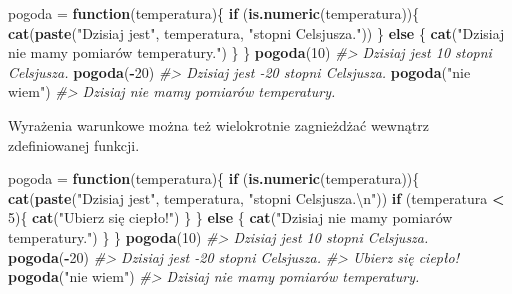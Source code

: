 \documentclass[paper=6in:9in,pagesize=pdftex,headinclude=on,footinclude=on,10pt]{scrbook}
\newenvironment{Shaded}{\begin{snugshade}}{\end{snugshade}}
\newcommand{\CharTok}[1]{\textcolor[rgb]{0.31,0.60,0.02}{#1}}
\newcommand{\CommentTok}[1]{\textcolor[rgb]{0.56,0.35,0.01}{\textit{#1}}}
\newcommand{\ControlFlowTok}[1]{\textcolor[rgb]{0.13,0.29,0.53}{\textbf{#1}}}
\newcommand{\DecValTok}[1]{\textcolor[rgb]{0.00,0.00,0.81}{#1}}
\newcommand{\KeywordTok}[1]{\textcolor[rgb]{0.13,0.29,0.53}{\textbf{#1}}}
\newcommand{\NormalTok}[1]{#1}
\newcommand{\OperatorTok}[1]{\textcolor[rgb]{0.81,0.36,0.00}{\textbf{#1}}}
\newcommand{\StringTok}[1]{\textcolor[rgb]{0.31,0.60,0.02}{#1}}
\begin{document}
\begin{Shaded}
\begin{Highlighting}[]
\NormalTok{pogoda =}\StringTok{ }\ControlFlowTok{function}\NormalTok{(temperatura)\{}
  \ControlFlowTok{if}\NormalTok{ (}\KeywordTok{is.numeric}\NormalTok{(temperatura))\{}
    \KeywordTok{cat}\NormalTok{(}\KeywordTok{paste}\NormalTok{(}\StringTok{"Dzisiaj jest"}\NormalTok{, temperatura, }\StringTok{"stopni Celsjusza."}\NormalTok{))}
\NormalTok{  \} }\ControlFlowTok{else}\NormalTok{ \{}
    \KeywordTok{cat}\NormalTok{(}\StringTok{"Dzisiaj nie mamy pomiarów temperatury."}\NormalTok{)}
\NormalTok{  \}}
\NormalTok{\}}
\KeywordTok{pogoda}\NormalTok{(}\DecValTok{10}\NormalTok{)}
\CommentTok{#> Dzisiaj jest 10 stopni Celsjusza.}
\KeywordTok{pogoda}\NormalTok{(}\OperatorTok{-}\DecValTok{20}\NormalTok{)}
\CommentTok{#> Dzisiaj jest -20 stopni Celsjusza.}
\KeywordTok{pogoda}\NormalTok{(}\StringTok{"nie wiem"}\NormalTok{)}
\CommentTok{#> Dzisiaj nie mamy pomiarów temperatury.}
\end{Highlighting}
\end{Shaded}

Wyrażenia warunkowe można też wielokrotnie zagnieżdżać wewnątrz zdefiniowanej funkcji.

\begin{Shaded}
\begin{Highlighting}[]
\NormalTok{pogoda =}\StringTok{ }\ControlFlowTok{function}\NormalTok{(temperatura)\{}
  \ControlFlowTok{if}\NormalTok{ (}\KeywordTok{is.numeric}\NormalTok{(temperatura))\{}
    \KeywordTok{cat}\NormalTok{(}\KeywordTok{paste}\NormalTok{(}\StringTok{"Dzisiaj jest"}\NormalTok{, temperatura, }\StringTok{"stopni Celsjusza.}\CharTok{\textbackslash{}n}\StringTok{"}\NormalTok{))}
    \ControlFlowTok{if}\NormalTok{ (temperatura }\OperatorTok{<}\StringTok{ }\DecValTok{5}\NormalTok{)\{}
      \KeywordTok{cat}\NormalTok{(}\StringTok{"Ubierz się ciepło!"}\NormalTok{)}
\NormalTok{    \}}
\NormalTok{  \} }\ControlFlowTok{else}\NormalTok{ \{}
    \KeywordTok{cat}\NormalTok{(}\StringTok{"Dzisiaj nie mamy pomiarów temperatury."}\NormalTok{)}
\NormalTok{  \}}
\NormalTok{\}}
\KeywordTok{pogoda}\NormalTok{(}\DecValTok{10}\NormalTok{)}
\CommentTok{#> Dzisiaj jest 10 stopni Celsjusza.}
\KeywordTok{pogoda}\NormalTok{(}\OperatorTok{-}\DecValTok{20}\NormalTok{)}
\CommentTok{#> Dzisiaj jest -20 stopni Celsjusza.}
\CommentTok{#> Ubierz się ciepło!}
\KeywordTok{pogoda}\NormalTok{(}\StringTok{"nie wiem"}\NormalTok{)}
\CommentTok{#> Dzisiaj nie mamy pomiarów temperatury.}
\end{Highlighting}
\end{Shaded}
\end{document}

